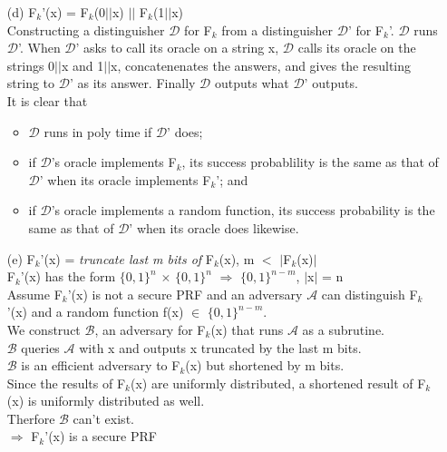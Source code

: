 \begin{itemize}
\item[(d)]
	F\(_{k}\)'(x) =  F\(_{k}\)(0\(\vert \vert\)x) \(\vert \vert\) F\(_{k}\)(1\(\vert \vert\)x) \\
	Constructing a distinguisher \(\mathcal{D}\) for F\(_{k}\) from a distinguisher \(\mathcal{D}\)' for F\(_{k}\)'. \(\mathcal{D}\) runs \(\mathcal{D}\)'. 
	When \(\mathcal{D}\)' asks to call its oracle on a string x, \(\mathcal{D}\) calls its oracle on the strings 0\(\vert \vert\)x and 1\(\vert \vert\)x, concatenenates
	the answers, and gives the resulting string to \(\mathcal{D}\)' as its answer. Finally \(\mathcal{D}\) outputs what  \(\mathcal{D}\)' outputs. \\
	It is clear that
	\begin{itemize}
		\item \(\mathcal{D}\) runs in poly time if \(\mathcal{D}\)' does;
		\item if \(\mathcal{D}\)'s oracle implements F\(_{k}\), its success probablility is the same as that of  \(\mathcal{D}\)' when its oracle implements F\(_{k}\)'; and
		\item if  \(\mathcal{D}\)'s oracle implements a random function, its success probability is the same as that of  \(\mathcal{D}\)' when its oracle does likewise.
	\end{itemize}
\item[(e)]
	F\(_{k}\)'(x)  = \textit{truncate last m bits of}  F\(_{k}\)(x), m \(<\) \(\vert\)F\(_{k}\)(x)\(\vert\) \\
	F\(_{k}\)'(x) has the form \(\{0,1\}^{n}\) \(\times\) \(\{0,1\}^{n}\) \(\Rightarrow\) \(\{0,1\}^{n-m}\), \(\vert\)x\(\vert\) = n \\
	Assume F\(_{k}\)'(x) is not a secure PRF and an adversary \(\mathcal{A}\) can distinguish F\(_{k}\)'(x) and a random function f(x) \(\in\) \(\{0,1\}^{n-m}\). \\
	We construct \(\mathcal{B}\), an adversary for F\(_{k}\)(x) that runs \(\mathcal{A}\) as a subrutine.\\
	\(\mathcal{B}\) queries \(\mathcal{A}\) with x and outputs x truncated by the last m bits. \\
	\(\mathcal{B}\) is an efficient adversary to F\(_{k}\)(x) but shortened by m bits.\\
	Since the results of F\(_{k}\)(x) are uniformly distributed, a shortened result of F\(_{k}\)(x) is uniformly distributed as well. \\
	Therfore \(\mathcal{B}\) can't exist. \\
	\(\Rightarrow\) F\(_{k}\)'(x) is a secure PRF \\
\end{itemize}
